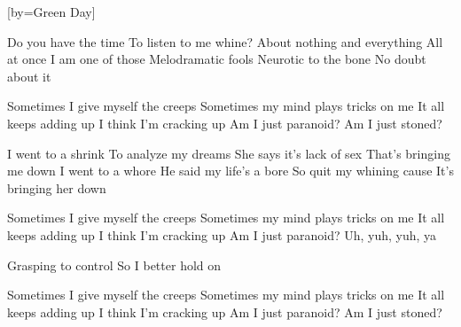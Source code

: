 [by={Green Day}]






\beginverse



Do you have the time To listen to me whine?
About nothing and everything All at once
I am one of those Melodramatic fools
Neurotic to the bone No doubt about it
\endverse

\beginverse
Sometimes I give myself the creeps
Sometimes my mind plays tricks on me
It all keeps adding up
I think I'm cracking up
Am I just paranoid?
Am I just stoned?
\endverse

\beginverse
I went to a shrink To analyze my dreams
She says it's lack of sex That's bringing me down
I went to a whore He said my life's a bore
So quit my whining cause It's bringing her down
\endverse

\beginverse
Sometimes I give myself the creeps
Sometimes my mind plays tricks on me
It all keeps adding up
I think I'm cracking up
Am I just paranoid?
Uh, yuh, yuh, ya
\endverse

\beginverse
Grasping to control
So I better hold on
\endverse

\beginverse
Sometimes I give myself the creeps
Sometimes my mind plays tricks on me
It all keeps adding up
I think I'm cracking up
Am I just paranoid?
Am I just stoned?
\endverse



\endsong
